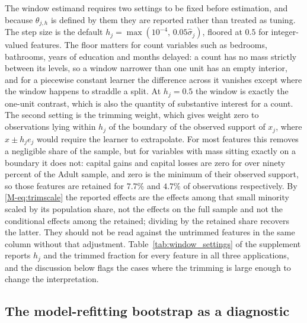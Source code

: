 \documentclass[12pt,a4paper]{article}
\numberwithin{equation}{section}
\theoremstyle{plain}
\theoremstyle{definition}
\begin{document}
The window estimand requires two settings to be fixed before estimation, and because $\theta_{j,h}$ is defined by them they are reported rather than treated as tuning. The step size is the default $h_j = \max(10^{-4},\, 0.05\hat{\sigma}_j)$, floored at $0.5$ for integer-valued features. The floor matters for count variables such as bedrooms, bathrooms, years of education and months delayed: a count has no mass strictly between its levels, so a window narrower than one unit has an empty interior, and for a piecewise constant learner the difference across it vanishes except where the window happens to straddle a split. At $h_j = 0.5$ the window is exactly the one-unit contrast, which is also the quantity of substantive interest for a count. The second setting is the trimming weight, which gives weight zero to observations lying within $h_j$ of the boundary of the observed support of $x_j$, where $x \pm h_j e_j$ would require the learner to extrapolate. For most features this removes a negligible share of the sample, but for variables with mass sitting exactly on a boundary it does not: capital gains and capital losses are zero for over ninety percent of the Adult sample, and zero is the minimum of their observed support, so those features are retained for $7.7\%$ and $4.7\%$ of observations respectively. By \eqref{M-eq:trimscale} the reported effects are the effects among that small minority scaled by its population share, not the effects on the full sample and not the conditional effects among the retained; dividing by the retained share recovers the latter. They should not be read against the untrimmed features in the same column without that adjustment. Table~\ref{tab:window_settings} of the supplement reports $h_j$ and the trimmed fraction for every feature in all three applications, and the discussion below flags the cases where the trimming is large enough to change the interpretation.
	\subsection*{The model-refitting bootstrap as a diagnostic}
\end{document}
